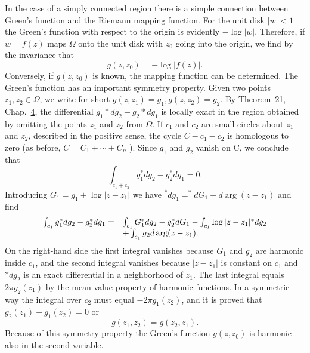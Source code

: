 In the case of a simply connected region there is a simple connection between Green's function and the Riemann mapping function. For the unit disk $|w| < 1$ the Green's function with respect to the origin is evidently $-\log |w|$. Therefore, if $w = f(z)$ maps $\Omega$ onto the unit disk with $z_0$ going into the origin, we find by the invariance that
\begin{equation*}
g (z, z _ {0}) = - \log | f (z) |.
\end{equation*}
Conversely, if $g(z,z_{0})$ is known, the mapping function can be determined. The Green's function has an important symmetry property. Given two points $z_{1}, z_{2} \in \Omega$, we write for short $g(z,z_{1}) = g_{1}, g(z,z_{2}) = g_{2}$. By Theorem~\hyperref[thm:4.21]{21}, Chap.~\hyperref[chap:4]{4}, the differential $g_{1} * dg_{2} - g_{2} * dg_{1}$ is locally exact in the region obtained by omitting the points $z_{1}$ and $z_{2}$ from $\Omega$. If $c_{1}$ and $c_{2}$ are small circles about $z_{1}$ and $z_{2}$, described in the positive sense, the cycle $C - c_{1} - c_{2}$ is homologous to zero (as before, $C = C_{1} + \cdots + C_{n}$ ). Since $g_{1}$ and $g_{2}$ vanish on C, we conclude that
\begin{equation*}
\int_ {c _ {1} + c _ {2}} g _ {1} ^ {*} d g _ {2} - g _ {2} ^ {*} d g _ {1} = 0.
\end{equation*}
Introducing $G_{1} = g_{1} + \log |z - z_{1}|$ we have $^{*}dg_{1} = ^{*}dG_{1} - d\arg (z - z_{1})$ and find
\begin{equation*}
\begin{array}{r l} \int_ {c _ {1}} g _ {1} ^ {*} d g _ {2} - g _ {2} ^ {*} d g _ {1} = & \int_ {c _ {1}} G _ {1} ^ {*} d g _ {2} - g _ {2} ^ {*} d G _ {1} - \int_ {c _ {1}} \log | z - z _ {1} | ^ {*} d g _ {2} \\ & + \int_ {c _ {1}} g _ {2} d \arg (z - z _ {1}). \end{array}
\end{equation*}
On the right-hand side the first integral vanishes because $G_{1}$ and $g_{2}$ are harmonic inside $c_{1}$, and the second integral vanishes because $|z - z_{1}|$ is constant on $c_{1}$ and $*dg_{2}$ is an exact differential in a neighborhood of $z_{1}$. The last integral equals $2\pi g_{2}(z_{1})$ by the mean-value property of harmonic functions. In a symmetric way the integral over $c_{2}$ must equal $-2\pi g_{1}(z_{2})$, and it is proved that $g_{2}(z_{1}) - g_{1}(z_{2}) = 0$ or
\begin{equation*}
g (z _ {1}, z _ {2}) = g (z _ {2}, z _ {1}).
\end{equation*}
Because of this symmetry property the Green's function $g(z, z_0)$ is harmonic also in the second variable.


